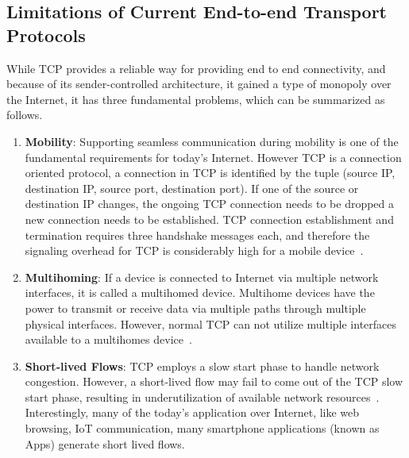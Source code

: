 \subsection{Limitations of Current End-to-end Transport Protocols}
While TCP provides a reliable way for providing end to end connectivity, and because of its sender-controlled architecture, it gained a type of monopoly over the Internet, it has three fundamental problems, which can be summarized as follows.  
\begin{enumerate}
	\item  \textbf{Mobility}: Supporting seamless communication during mobility is one of the fundamental requirements for today's Internet. However TCP is a connection oriented protocol, a connection in TCP is identified by the tuple (source IP, destination IP, source port, destination port). If one of the source or destination IP changes, the ongoing TCP connection needs to be dropped a new connection needs to be established. TCP connection establishment and termination requires three handshake messages each, and therefore the signaling overhead for TCP is considerably high for a mobile device~\cite{yadav2016msocket}. 
	\item \textbf{Multihoming}: If a device is connected to Internet via multiple network interfaces, it is called a multihomed device. Multihome devices have the power to transmit or receive data via multiple paths through multiple physical interfaces. However, normal TCP can not utilize multiple interfaces available to a multihomes device~\cite{abdrabou2016experimental,de2016observing}. 
	\item \textbf{Short-lived Flows}: TCP employs a slow start phase to handle network congestion. However, a short-lived flow may fail to come out of the TCP slow start phase, resulting in underutilization of available network resources~\cite{de2016throughput,islam2016start}. Interestingly, many of the today's application over Internet, like web browsing, IoT communication, many smartphone applications (known as Apps) generate short lived flows. 
\end{enumerate}

